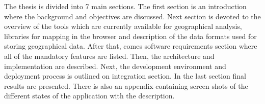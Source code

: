 The thesis is divided into 7 main sections. The first section is an introduction where the
background and objectives are discussed. Next section is devoted to the overview of the tools which
are currently available for geographical analysis, libraries for mapping in the browser and
description of the data formats used for storing geographical data. After that, comes software
requirements section where all of the mandatory features are listed. Then, the architecture and
implementation are described. Next, the development environment and deployment process is outlined on
integration section. In the last section final results are presented. There is also an appendix
containing screen shots of the different states of the application with the description.
